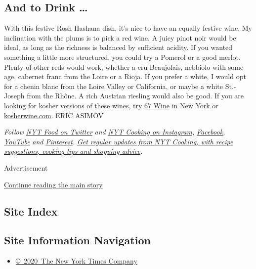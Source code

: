 \hypertarget{and-to-drink-}{%
\subsection{And to Drink \ldots{}}\label{and-to-drink-}}

With this festive Rosh Hashana dish, it's nice to have an equally
festive wine. My inclination with the plums is to pick a red wine. A
juicy pinot noir would be ideal, as long as the richness is balanced by
sufficient acidity. If you wanted something a little more structured,
you could try a Pomerol or a good merlot. Plenty of other reds would
work, whether a cru Beaujolais, nebbiolo with some age, cabernet franc
from the Loire or a Rioja. If you prefer a white, I would opt for a
chenin blanc from the Loire Valley or California, or maybe a white
St.-Joseph from the Rhône. A rich Austrian riesling would also be good.
If you are looking for kosher versions of these wines, try
\href{https://www.67wine.com/}{67 Wine} in New York or
\href{https://www.kosherwine.com/?keyword=kosherwine.com\&gclid=EAIaIQobChMIv-v0kIDO6wIVC-DICh26wQkuEAAYASAAEgLVC_D_BwE}{kosherwine.com}.
ERIC ASIMOV

\emph{Follow} \href{https://twitter.com/nytfood}{\emph{NYT Food on
Twitter}} \emph{and}
\href{https://www.instagram.com/nytcooking/}{\emph{NYT Cooking on
Instagram}}\emph{,}
\href{https://www.facebookcorewwwi.onion/nytcooking/}{\emph{Facebook}}\emph{,}
\href{https://www.youtube.com/nytcooking}{\emph{YouTube}} \emph{and}
\href{https://www.pinterest.com/nytcooking/}{\emph{Pinterest}}\emph{.}
\href{https://www.nytimes3xbfgragh.onion/newsletters/cooking}{\emph{Get
regular updates from NYT Cooking, with recipe suggestions, cooking tips
and shopping advice}}\emph{.}

Advertisement

\protect\hyperlink{after-bottom}{Continue reading the main story}

\hypertarget{site-index}{%
\subsection{Site Index}\label{site-index}}

\hypertarget{site-information-navigation}{%
\subsection{Site Information
Navigation}\label{site-information-navigation}}

\begin{itemize}
\tightlist
\item
  \href{https://help.nytimes3xbfgragh.onion/hc/en-us/articles/115014792127-Copyright-notice}{©~2020~The
  New York Times Company}
\end{itemize}

